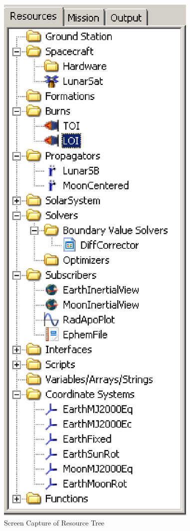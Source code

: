 \begin{figure}[tb]
\begin{center}
\includegraphics*[scale=0.58]{Images/ResourceTreeScreenShot.eps}
\caption{\label{fig:ResourceTreeCapture} Screen Capture of Resource Tree}
\end{center}
\end{figure}
